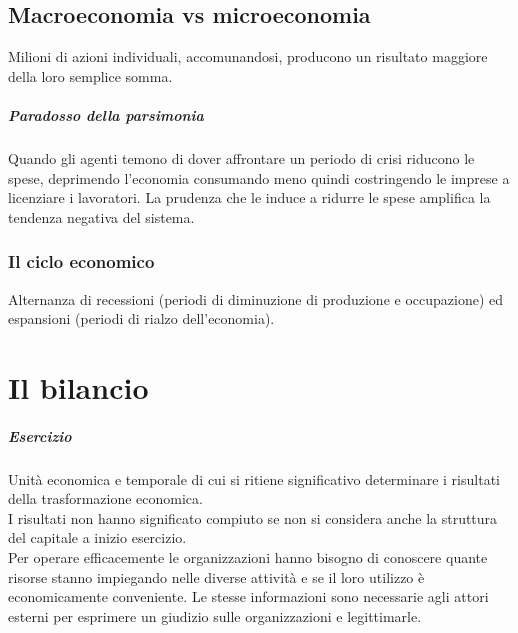 \documentclass{report}
\begin{document}
	\section{Macroeconomia vs microeconomia}
	Milioni di azioni individuali, accomunandosi, producono un risultato maggiore della loro semplice somma.
	\paragraph{Paradosso della parsimonia} Quando gli agenti temono di dover affrontare un periodo di crisi riducono le spese, deprimendo l'economia consumando meno quindi costringendo le imprese a licenziare i lavoratori. La prudenza che le induce a ridurre le spese amplifica la tendenza negativa del sistema.
	\subsection{Il ciclo economico}
	Alternanza di recessioni (periodi di diminuzione di produzione e occupazione) ed espansioni (periodi di rialzo dell'economia).\\
	
	\chapter{Il bilancio}
	\paragraph{Esercizio} Unità economica e temporale di cui si ritiene significativo determinare i risultati della trasformazione economica.
	\medskip \\I risultati non hanno significato compiuto se non si considera anche la struttura del capitale a inizio esercizio.
	\medskip \\Per operare efficacemente le organizzazioni hanno bisogno di conoscere quante risorse stanno impiegando nelle diverse attività e se il loro utilizzo è economicamente conveniente. Le stesse informazioni sono necessarie agli attori esterni per esprimere un giudizio sulle organizzazioni e legittimarle.
\end{document}
